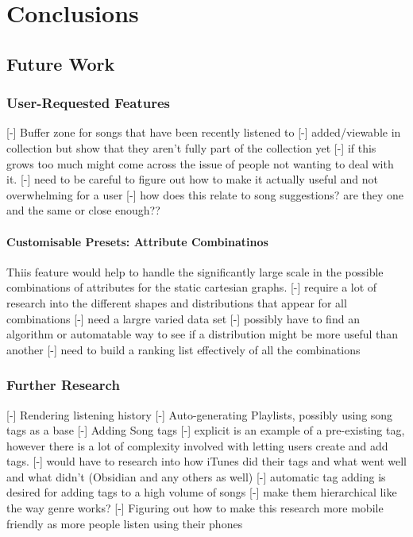\chapter{Conclusions}%


\section{Future Work}
\subsection{User-Requested Features}
[-] Buffer zone for songs that have been recently listened to
    [-] added/viewable in collection but show that they aren't fully part of the collection yet
    [-] if this grows too much might come across the issue of people not wanting to deal with it.
    [-] need to be careful to figure out how to make it actually useful and not overwhelming for a user
    [-] how does this relate to song suggestions? are they one and the same or close enough??

\subsubsection{Customisable Presets: Attribute Combinatinos}
Thiis feature would help to handle the significantly large scale in the possible combinations of attributes for the static cartesian graphs.
    [-] require a lot of research into the different shapes and distributions that appear for all combinations
    [-] need a largre varied data set
    [-] possibly have to find an algorithm or automatable way to see if a distribution might be more useful than another
    [-] need to build a ranking list effectively of all the combinations

\subsection{Further Research}
[-] Rendering listening history
[-] Auto-generating Playlists, possibly using song tags as a base
[-] Adding Song tags
    [-] explicit is an example of a pre-existing tag, however there is a lot of complexity involved with letting users create and add tags.
    [-] would have to research into how iTunes did their tags and what went well and what didn't (Obsidian and any others as well)
    [-] automatic tag adding is desired for adding tags to a high volume of songs
    [-] make them hierarchical like the way genre works?
[-] Figuring out how to make this research more mobile friendly as more people listen using their phones\cite{} %